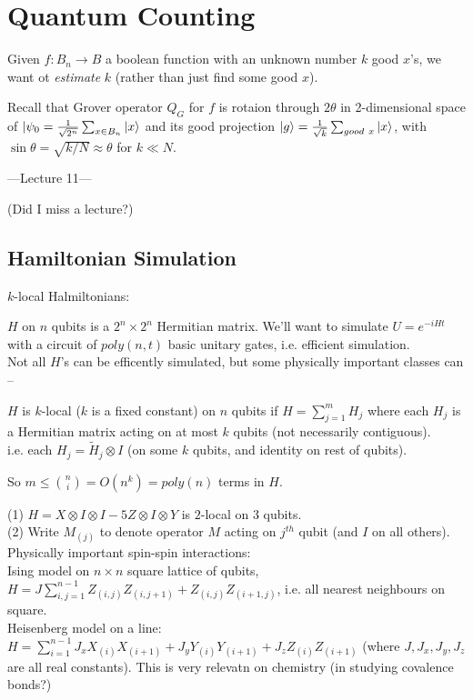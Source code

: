 \documentclass[a4paper]{article}
\begin{document}
\newpage

\section{Quantum Counting}

Given $f:B_n \to B$ a boolean function with an unknown number $k$ good $x$'s, we want ot \emph{estimate} $k$ (rather than just find some good $x$).

Recall that Grover operator $Q_G$ for $f$ is rotaion through $2\theta$ in 2-dimensional space of $|\psi_0 = \frac{1}{\sqrt{2^n}} \sum_{x \in B_n} |x\rangle$ and its good projection $|g\rangle = \frac{1}{\sqrt{k}} \sum_{good\ x} |x\rangle$, with $\sin\theta = \sqrt{k/N} \approx \theta$ for $k \ll N$.

---Lecture 11---

(Did I miss a lecture?)

\subsection{Hamiltonian Simulation}

$k$-local Halmiltonians:

$H$ on $n$ qubits is a $2^n \times 2^n$ Hermitian matrix. We'll want to simulate $U=e^{-iHt}$ with a circuit of $poly(n,t)$ basic unitary gates, i.e. efficient simulation.\\
Not all $H$'s can be efficently simulated, but some physically important classes can --

\begin{defi}
    $H$ is $k$-local ($k$ is a fixed constant) on $n$ qubits if $H=\sum_{j=1}^m H_j$ where each $H_j$ is a Hermitian matrix acting on at most $k$ qubits (not necessarily contiguous).\\
    i.e. each $H_j = \tilde{H}_j \otimes I$ (on some $k$ qubits, and identity on rest of qubits).

    So $m \leq {n \choose i} =O(n^k) = poly(n)$ terms in $H$.
\end{defi}

\begin{eg}
    (1) $H=X \otimes I \otimes I - 5 Z \otimes I \otimes Y$ is $2$-local on 3 qubits.\\
    (2) Write $M_{(j)}$ to denote operator $M$ acting on $j^{th}$ qubit (and $I$ on all others). Physically important spin-spin interactions:\\
    Ising model on $n\times n$ square lattice of qubits, $H=J \sum_{i,j=1}^{n-1} Z_{(i,j)} Z_{(i,j+1)} + Z_{(i,j)}Z_{(i+1,j)}$, i.e. all nearest neighbours on square.\\
    Heisenberg model on a line: $H=\sum_{i=1}^{n-1} J_x X_{(i)} X_{(i+1)} + J_y Y_{(i)} Y_{(i+1)} + J_z Z_{(i)} Z_{(i+1)}$ (where $J,J_x,J_y,J_z$ are all real constants). This is very relevatn on chemistry (in studying covalence bonds?)
\end{eg}
\end{document}
